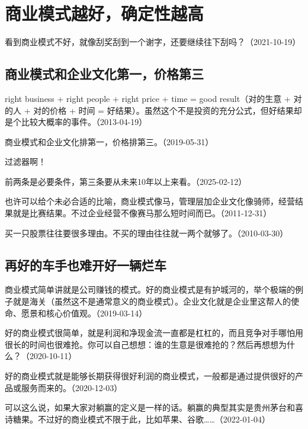 
\section{商业模式越好，确定性越高}

看到商业模式不好，就像刮奖刮到一个谢字，还要继续往下刮吗？（2021-10-19）

\subsection{商业模式和企业文化第一，价格第三}

right business + right people + right price + time = good result（对的生意 + 对的人 + 对的价格 + 时间 = 好结果）。虽然这个不是投资的充分公式，但好结果却是个比较大概率的事件。（2013-04-19）


商业模式和企业文化排第一，价格排第三。（2019-05-31）


过滤器啊！

前两条是必要条件，第三条要从未来10年以上来看。（2025-02-12）

也许可以给个未必合适的比喻，商业模式像马，管理层加企业文化像骑师，经营结果就是比赛结果。不过企业经营不像赛马那么短时间而已。（2011-12-31）

买一只股票往往要很多理由。不买的理由往往就一两个就够了。（2010-03-30）

\subsection{再好的车手也难开好一辆烂车}

商业模式简单讲就是公司赚钱的模式。好的商业模式是有护城河的，举个极端的例子就是海关（虽然这不是通常意义的商业模式）。企业文化就是企业里这帮人的使命、愿景和核心价值观。（2019-03-14）

好的商业模式很简单，就是利润和净现金流一直都是杠杠的，而且竞争对手哪怕用很长的时间也很难抢。你可以自己想想：谁的生意是很难抢的？然后再想想为什么？（2020-10-11）

好的商业模式就是能够长期获得很好利润的商业模式，一般都是通过提供很好的产品或服务而来的。（2020-12-03）


可以这么说，如果大家对躺赢的定义是一样的话。躺赢的典型其实是贵州茅台和喜诗糖果。不过好的商业模式不限于此，比如苹果、谷歌……（2022-01-04）

